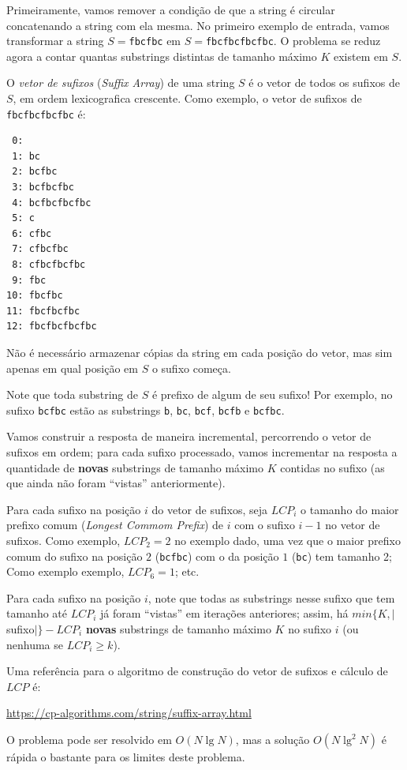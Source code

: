 
Primeiramente, vamos remover a condição de que a string é circular concatenando
a string com ela mesma. No primeiro exemplo de entrada, vamos transformar a
string $S=$\texttt{fbcfbc} em $S=$\texttt{fbcfbcfbcfbc}. O problema se reduz agora a
contar quantas substrings distintas de tamanho máximo $K$ existem em $S$.

O \textit{vetor de sufixos} (\textit{Suffix Array}) de uma string $S$ é o vetor
de todos os sufixos de $S$, em ordem lexicografica crescente. Como exemplo, o
vetor de sufixos de \texttt{fbcfbcfbcfbc} é:

\begin{verbatim}
 0:
 1: bc
 2: bcfbc
 3: bcfbcfbc
 4: bcfbcfbcfbc
 5: c
 6: cfbc
 7: cfbcfbc
 8: cfbcfbcfbc
 9: fbc
10: fbcfbc
11: fbcfbcfbc
12: fbcfbcfbcfbc
\end{verbatim}

Não é necessário armazenar cópias da string em cada posição do vetor, mas sim
apenas em qual posição em $S$ o sufixo começa.

Note que toda substring de $S$ é prefixo de algum de seu sufixo! Por exemplo, no
sufixo \texttt{bcfbc} estão as substrings \texttt{b}, \texttt{bc}, \texttt{bcf},
\texttt{bcfb} e \texttt{bcfbc}.

Vamos construir a resposta de maneira incremental, percorrendo o vetor de
sufixos em ordem; para cada sufixo processado, vamos incrementar na resposta a
quantidade de \textbf{novas} substrings de tamanho máximo $K$ contidas no
sufixo (as que ainda não foram ``vistas'' anteriormente).

Para cada sufixo na posição $i$ do vetor de sufixos, seja $LCP_i$ o tamanho do maior prefixo comum (\textit{Longest Commom
Prefix}) de $i$ com o sufixo $i-1$ no vetor de sufixos. Como exemplo,
$LCP_2 = 2$ no exemplo dado, uma vez que o maior prefixo comum do sufixo na
posição $2$ (\texttt{bcfbc}) com o da posição $1$ (\texttt{bc}) tem tamanho 2;
Como exemplo exemplo, $LCP_6 = 1$; etc.

Para cada sufixo na posição $i$, note que todas as substrings nesse sufixo que
tem tamanho até $LCP_i$ já foram ``vistas'' em iterações anteriores; assim, há
$min\{K,|$sufixo$|\} - LCP_i$ \textbf{novas} substrings de tamanho máximo $K$ no
sufixo $i$ (ou nenhuma se $LCP_i \geq k$).

Uma referência para o algoritmo de construção do vetor de sufixos e cálculo de
$LCP$ é:

\url{https://cp-algorithms.com/string/suffix-array.html}

O problema pode ser resolvido em $O(N\lg N)$, mas a solução $O(N\lg^2 N)$ é
rápida o bastante para os limites deste problema.
